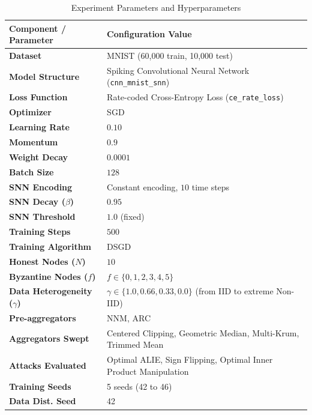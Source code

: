 \documentclass{article}
\begin{document}
\begin{table}[htbp]
    \centering
    \caption{Experiment Parameters and Hyperparameters}
    \label{tab:params}
    \begin{tabular}{ll}
        \toprule
        \textbf{Component / Parameter} & \textbf{Configuration Value} \\
        \midrule
        \textbf{Dataset} & MNIST (60,000 train, 10,000 test) \\
        \textbf{Model Structure} & Spiking Convolutional Neural Network (\texttt{cnn\_mnist\_snn}) \\
        \textbf{Loss Function} & Rate-coded Cross-Entropy Loss (\texttt{ce\_rate\_loss}) \\
        \textbf{Optimizer} & SGD \\
        \textbf{Learning Rate} & $0.10$ \\
        \textbf{Momentum} & $0.9$ \\
        \textbf{Weight Decay} & $0.0001$ \\
        \textbf{Batch Size} & $128$ \\
        \textbf{SNN Encoding} & Constant encoding, $10$ time steps \\
        \textbf{SNN Decay ($\beta$)} & $0.95$ \\
        \textbf{SNN Threshold} & $1.0$ (fixed) \\
        \textbf{Training Steps} & $500$ \\
        \textbf{Training Algorithm} & DSGD \\
        \textbf{Honest Nodes ($N$)} & $10$ \\
        \textbf{Byzantine Nodes ($f$)} & $f \in \{0, 1, 2, 3, 4, 5\}$ \\
        \textbf{Data Heterogeneity ($\gamma$)} & $\gamma \in \{1.0, 0.66, 0.33, 0.0\}$ (from IID to extreme Non-IID) \\
        \textbf{Pre-aggregators} & NNM, ARC \\
        \textbf{Aggregators Swept} & Centered Clipping, Geometric Median, Multi-Krum, Trimmed Mean \\
        \textbf{Attacks Evaluated} & Optimal ALIE, Sign Flipping, Optimal Inner Product Manipulation \\
        \textbf{Training Seeds} & 5 seeds (42 to 46) \\
        \textbf{Data Dist. Seed} & 42 \\
        \bottomrule
    \end{tabular}
\end{table}
\end{document}
